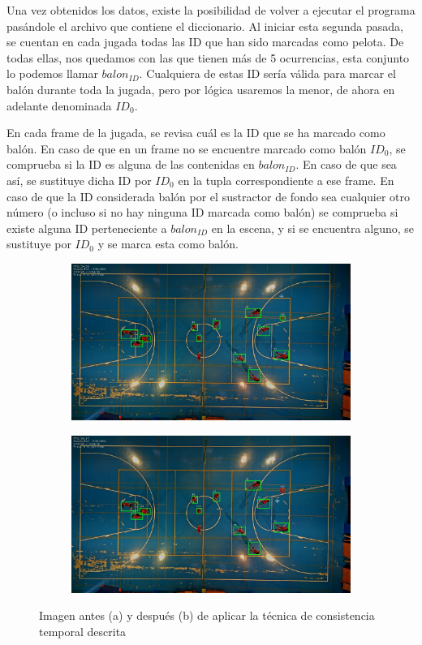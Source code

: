 Una vez obtenidos los datos, existe la posibilidad de volver a ejecutar el programa pasándole el archivo que contiene el diccionario. Al iniciar esta segunda pasada, se cuentan en cada jugada todas las ID que han sido marcadas como pelota. De todas ellas, nos quedamos con las que tienen más de 5 ocurrencias, esta conjunto lo podemos llamar $balon_{ID}$. Cualquiera de estas ID sería válida para marcar el balón durante toda la jugada, pero por lógica usaremos la menor, de ahora en adelante denominada $ID_0$.

En cada frame de la jugada, se revisa cuál es la ID que se ha marcado como balón. En caso de que en un frame no se encuentre marcado como balón $ID_0$, se comprueba si la ID es alguna de las contenidas en $balon_{ID}$. En caso de que sea así, se sustituye dicha ID por $ID_0$ en la tupla correspondiente a ese frame. En caso de que la ID considerada balón por el sustractor de fondo sea cualquier otro número (o incluso si no hay ninguna ID marcada como balón) se comprueba si existe alguna ID perteneciente a $balon_{ID}$ en la escena, y si se encuentra alguno, se sustituye por $ID_0$ y se marca esta como balón.

\begin{figure}
\begin{subfigure}{.5\textwidth}
  \centering
  \includegraphics[width=.9\linewidth]{images/noconsistencia}
  \caption { }
  \label{fig:consa}
\end{subfigure}%
\begin{subfigure}{.5\textwidth}
  \centering
  \includegraphics[width=.9\linewidth]{images/consistencia}
  \caption { }
  \label{fig:consb}
\end{subfigure}
\caption{Imagen antes (a) y después (b) de aplicar la técnica de consistencia temporal descrita}
\label{fig:cons}
\end{figure}


